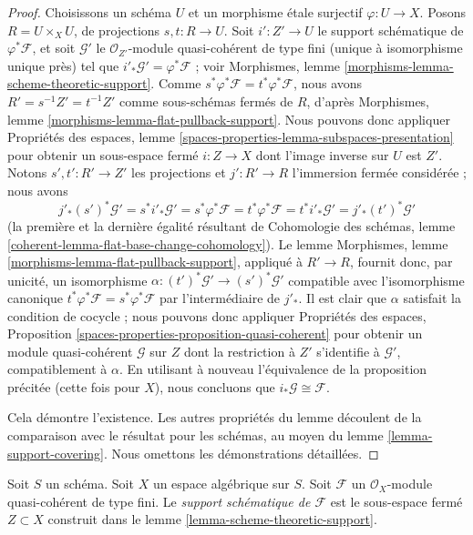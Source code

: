\begin{proof}
Choisissons un schéma $U$ et un morphisme étale surjectif $\varphi : U \to X$.
Posons $R = U \times_X U$, de projections $s, t : R \to U$.
Soit $i' : Z' \to U$ le support schématique de $\varphi^*\mathcal{F}$,
et soit $\mathcal{G}'$ le $\mathcal{O}_{Z'}$-module quasi-cohérent de type fini
(unique à isomorphisme unique près)
tel que $i'_*\mathcal{G}' = \varphi^*\mathcal{F}$ ; voir
Morphismes, lemme \ref{morphisms-lemma-scheme-theoretic-support}.
Comme $s^*\varphi^*\mathcal{F} = t^*\varphi^*\mathcal{F}$, nous avons
$R' = s^{-1}Z' = t^{-1}Z'$ comme sous-schémas fermés de $R$, d'après
Morphismes, lemme \ref{morphisms-lemma-flat-pullback-support}.
Nous pouvons donc appliquer Propriétés des espaces, lemme
\ref{spaces-properties-lemma-subspaces-presentation}
pour obtenir un sous-espace fermé $i : Z \to X$ dont l'image inverse sur $U$ est $Z'$.
Notons $s', t' : R' \to Z'$ les projections et
$j' : R' \to R$ l'immersion fermée considérée ; nous avons
$$
j'_* (s')^*\mathcal{G}' = s^* i'_*\mathcal{G}' =
s^*\varphi^*\mathcal{F} = t^*\varphi^*\mathcal{F} =
t^*i'_*\mathcal{G}' = j'_*(t')^*\mathcal{G}'
$$
(la première et la dernière égalité résultant de Cohomologie des schémas,
lemme \ref{coherent-lemma-flat-base-change-cohomology}).
Le lemme
Morphismes, lemme \ref{morphisms-lemma-flat-pullback-support},
appliqué à $R' \to R$, fournit donc, par unicité, un isomorphisme
$\alpha : (t')^*\mathcal{G}' \to (s')^*\mathcal{G}'$
compatible avec l'isomorphisme canonique
$t^*\varphi^*\mathcal{F} = s^*\varphi^*\mathcal{F}$
par l'intermédiaire de $j'_*$. Il est clair que $\alpha$ satisfait la condition de cocycle ;
nous pouvons donc appliquer
Propriétés des espaces, Proposition
\ref{spaces-properties-proposition-quasi-coherent}
pour obtenir un module quasi-cohérent $\mathcal{G}$ sur $Z$ dont la restriction
à $Z'$ s'identifie à $\mathcal{G}'$, compatiblement à $\alpha$.
En utilisant à nouveau l'équivalence de la proposition précitée
(cette fois pour $X$), nous concluons que $i_*\mathcal{G} \cong \mathcal{F}$.

\medskip\noindent
Cela démontre l'existence. Les autres propriétés du lemme découlent
de la comparaison avec le résultat pour les schémas, au moyen du
lemme \ref{lemma-support-covering}.
Nous omettons les démonstrations détaillées.
\end{proof}

\begin{definition}
\label{definition-scheme-theoretic-support}
Soit $S$ un schéma. Soit $X$ un espace algébrique sur $S$.
Soit $\mathcal{F}$ un $\mathcal{O}_X$-module quasi-cohérent de type fini.
Le {\it support schématique de $\mathcal{F}$} est le sous-espace fermé
$Z \subset X$ construit dans le lemme \ref{lemma-scheme-theoretic-support}.
\end{definition}

